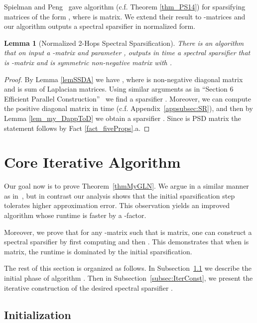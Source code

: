 \documentclass[11pt]{article}
\newtheorem{lem}[thm]{Lemma}
\numberwithin{thm}{section}
\begin{document}
Spielman and Peng~\cite{PS14} gave algorithm  (c.f. Theorem \ref{thm_PS14}) for sparsifying matrices of the form , where  is  matrix. We extend their result to -matrices and our algorithm outputs a spectral sparsifier in normalized form.

\begin{lem}[Normalized 2-Hops Spectral Sparsification]\label{lemmPS}
There is an algorithm  that on input a -matrix  and parameter , outputs in  time a spectral sparsifier  that is -matrix and  is symmetric non-negative matrix with .
\end{lem}


\begin{proof}
By Lemma \ref{lemSSDA} we have , where  is non-negative diagonal matrix and  is sum of Laplacian matrices. Using similar arguments as in ``Section 6 Efficient Parallel Construction''~\cite{PS14} we find a sparsifier . Moreover, we can compute the positive diagonal matrix  in  time (c.f. Appendix~\ref{appsubsec:SR}), and then by Lemma \ref{lem_my_DappToD} we obtain a sparsifier . Since  is PSD matrix the statement follows by Fact \ref{fact_fiveProps}.a.
\end{proof}



\section{Core Iterative Algorithm}\label{sec:CIA}

Our goal now is to prove Theorem~\ref{thmMyGLN}. We argue in a similar manner as in~\cite{arxivCCLPT15}, but in contrast our analysis shows that the initial sparsification step tolerates higher approximation error. This observation yields an improved algorithm whose runtime is faster by a -factor.

Moreover, we prove that for any -matrix  such that  is  matrix, one can construct a spectral sparsifier  by first computing  and then . This demonstrates that when  is  matrix, the runtime is dominated by the initial sparsification.

The rest of this section is organized as follows. In Subsection~\ref{subsec:Init_PrwSS} we describe the initial phase of algorithm . Then in Subsection~\ref{subsec:IterConst}, we present the iterative construction of the desired spectral sparsifier .


\subsection{Initialization}\label{subsec:Init_PrwSS}
\end{document}
